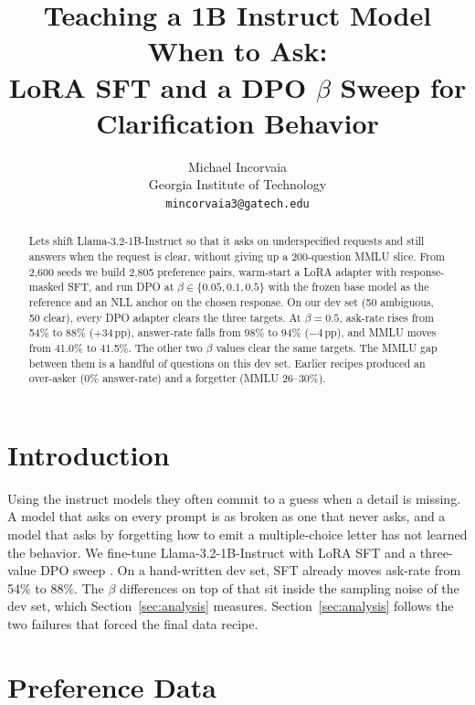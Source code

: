\documentclass[11pt]{article}
\title{Teaching a 1B Instruct Model When to Ask:\\
LoRA SFT and a DPO $\beta$ Sweep for Clarification Behavior}
\author{Michael Incorvaia \\
  Georgia Institute of Technology \\
  \texttt{mincorvaia3@gatech.edu}}
\newcommand{\pp}{\,pp}
\begin{document}
\maketitle

\begin{abstract}
Lets shift Llama-3.2-1B-Instruct so that it asks on underspecified requests and still answers when the request is clear, without giving up a 200-question MMLU slice.
From 2,600 seeds we build 2,805 preference pairs, warm-start a LoRA adapter with response-masked SFT, and run DPO at $\beta \in \{0.05, 0.1, 0.5\}$ with the frozen base model as the reference and an NLL anchor on the chosen response.
On our dev set (50 ambiguous, 50 clear), every DPO adapter clears the three targets.
At $\beta{=}0.5$, ask-rate rises from 54\% to 88\% ($+34$\pp), answer-rate falls from 98\% to 94\% ($-4$\pp), and MMLU moves from 41.0\% to 41.5\%.
The other two $\beta$ values clear the same targets. The MMLU gap between them is a handful of questions on this dev set.
Earlier recipes produced an over-asker (0\% answer-rate) and a forgetter (MMLU 26--30\%).
\end{abstract}

\section{Introduction}
\label{sec:intro}

Using the instruct models they often commit to a guess when a detail is missing.
A model that asks on every prompt is as broken as one that never asks, and a model that asks by forgetting how to emit a multiple-choice letter has not learned the behavior.
We fine-tune Llama-3.2-1B-Instruct \citep{grattafiori2024llama3} with LoRA \citep{hu2022lora} SFT and a three-value DPO sweep \citep{rafailov2023dpo}.
On a hand-written dev set, SFT already moves ask-rate from 54\% to 88\%. The $\beta$ differences on top of that sit inside the sampling noise of the dev set, which Section~\ref{sec:analysis} measures.
Section~\ref{sec:analysis} follows the two failures that forced the final data recipe.

\section{Preference Data}
\label{sec:data}
\end{document}
